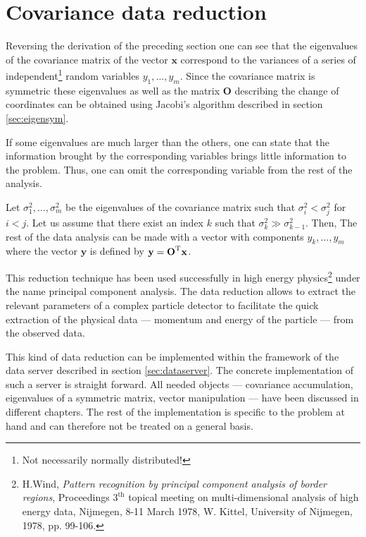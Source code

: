 \section{Covariance data reduction}
\label{sec:datared} Reversing the derivation of the preceding
section one can see that the eigenvalues of the covariance matrix
of the vector $\textbf{x}$ correspond to the variances of a series of
independent\footnote{Not necessarily normally distributed!} random
variables $y_1,\dots,y_m$. Since the covariance matrix is
symmetric these eigenvalues as well as the matrix $\textbf{O}$
describing the change of coordinates can be obtained using
Jacobi's algorithm described in section \ref{sec:eigensym}.

If some eigenvalues are much larger than the others, one can state
that the information brought by the corresponding variables brings
little information to the problem. Thus, one can omit the
corresponding variable from the rest of the analysis.

Let $\sigma^2_1,\ldots,\sigma^2_m$ be the eigenvalues of the
covariance matrix such that $\sigma^2_i < \sigma^2_j$ for $i<j$.
Let us assume that there exist an index $k$ such that $\sigma^2_k
\gg \sigma^2_{k-1}$. Then,  The rest of the data analysis can be
made with a vector with components $y_k,\ldots,y_m$ where the
vector $\textbf{y}$ is defined by $\textbf{y}=\textbf{O}^{\mathop\textrm{T}}{\textbf x}$.

This reduction technique has been used successfully in high energy
physics\footnote{H.Wind, {\em Pattern recognition by principal
component analysis of border regions}, Proceedings $3^{\mathop\textrm{
th}}$ topical meeting on multi-dimensional analysis of high energy
data, Nijmegen, 8-11 March 1978, W. Kittel, University of
Nijmegen, 1978, pp. 99-106.} under the name principal component
analysis. The data reduction allows to extract the relevant
parameters of a complex particle detector to facilitate the quick
extraction of the physical data --- momentum and energy of the
particle --- from the observed data.

This kind of data reduction can be implemented within the
framework of the data server described in section
\ref{sec:dataserver}. The concrete implementation of such a server
is straight forward. All needed objects --- covariance
accumulation, eigenvalues of a symmetric matrix, vector
manipulation --- have been discussed in different chapters. The
rest of the implementation is specific to the problem at hand and
can therefore not be treated on a general basis.

